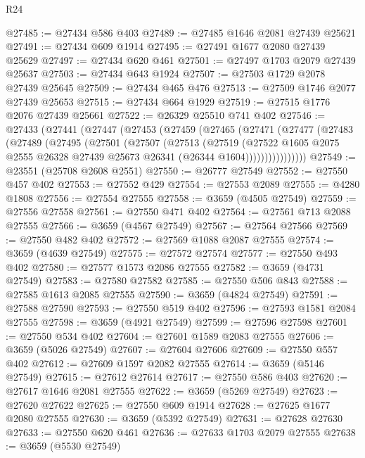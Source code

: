 \begin{lexlean}{R24}
\begin{coremodule}
@27485 := @27434 @586 @403
@27489 := @27485 @1646 @2081 @27439 @25621
@27491 := @27434 @609 @1914
@27495 := @27491 @1677 @2080 @27439 @25629
@27497 := @27434 @620 @461
@27501 := @27497 @1703 @2079 @27439 @25637
@27503 := @27434 @643 @1924
@27507 := @27503 @1729 @2078 @27439 @25645
@27509 := @27434 @465 @476
@27513 := @27509 @1746 @2077 @27439 @25653
@27515 := @27434 @664 @1929
@27519 := @27515 @1776 @2076 @27439 @25661
@27522 := @26329 @25510 @741 @402
@27546 := @27433
    (@27441
      (@27447
        (@27453
          (@27459
            (@27465
              (@27471
                (@27477
                  (@27483
                    (@27489
                      (@27495
                        (@27501
                          (@27507
                            (@27513
                              (@27519
                                (@27522
                                  @1605
                                  @2075
                                  @2555
                                  @26328
                                  @27439
                                  @25673
                                  @26341
                                  (@26344 @1604))))))))))))))))
@27549 := @23551 (@25708 @2608 @2551)
@27550 := @26777 @27549
@27552 := @27550 @457 @402
@27553 := @27552 @429
@27554 := @27553 @2089
@27555 := @4280 @1808
@27556 := @27554 @27555
@27558 := @3659 (@4505 @27549)
@27559 := @27556 @27558
@27561 := @27550 @471 @402
@27564 := @27561 @713 @2088 @27555
@27566 := @3659 (@4567 @27549)
@27567 := @27564 @27566
@27569 := @27550 @482 @402
@27572 := @27569 @1088 @2087 @27555
@27574 := @3659 (@4639 @27549)
@27575 := @27572 @27574
@27577 := @27550 @493 @402
@27580 := @27577 @1573 @2086 @27555
@27582 := @3659 (@4731 @27549)
@27583 := @27580 @27582
@27585 := @27550 @506 @843
@27588 := @27585 @1613 @2085 @27555
@27590 := @3659 (@4824 @27549)
@27591 := @27588 @27590
@27593 := @27550 @519 @402
@27596 := @27593 @1581 @2084 @27555
@27598 := @3659 (@4921 @27549)
@27599 := @27596 @27598
@27601 := @27550 @534 @402
@27604 := @27601 @1589 @2083 @27555
@27606 := @3659 (@5026 @27549)
@27607 := @27604 @27606
@27609 := @27550 @557 @402
@27612 := @27609 @1597 @2082 @27555
@27614 := @3659 (@5146 @27549)
@27615 := @27612 @27614
@27617 := @27550 @586 @403
@27620 := @27617 @1646 @2081 @27555
@27622 := @3659 (@5269 @27549)
@27623 := @27620 @27622
@27625 := @27550 @609 @1914
@27628 := @27625 @1677 @2080 @27555
@27630 := @3659 (@5392 @27549)
@27631 := @27628 @27630
@27633 := @27550 @620 @461
@27636 := @27633 @1703 @2079 @27555
@27638 := @3659 (@5530 @27549)

\end{coremodule}
\end{lexlean}
